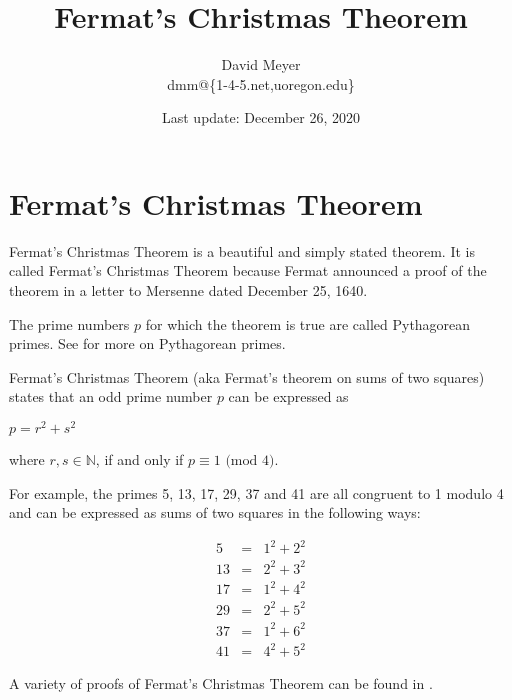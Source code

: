 \documentclass[11pt, oneside]{article}   	%
\title{Fermat's Christmas Theorem}
\author{David Meyer \\ dmm@\{1-4-5.net,uoregon.edu\}}
\date{Last update: December 26, 2020}
\theoremstyle{definition}
\begin{document}
\maketitle

\section*{Fermat's Christmas Theorem}

\noindent
Fermat's Christmas Theorem \cite{wiki:christmas_theorem} is a beautiful and simply stated theorem. It is called Fermat's Christmas Theorem because Fermat announced 
a proof of the theorem in a letter to Mersenne dated December 25, 1640. 

\bigskip
\noindent
The prime numbers $p$ for which the theorem is true are called Pythagorean primes. See \cite{wiki:pythagorean_primes} for more on Pythagorean primes.

\bigskip
\noindent
Fermat's Christmas Theorem (aka Fermat's theorem on sums of two squares) states that an odd prime number $p$ can be expressed as

\bigskip
\begin{center}
\scalebox{2.00} {$p = r^{2} + s^{2}$}
\end{center}
\bigskip

\noindent
where $r,s \in \mathbb{N}$, if and only if $p \equiv 1 \textrm{ (mod  $4$)}$.

\bigskip
\noindent
For example, the primes 5, 13, 17, 29, 37 and 41 are all congruent to 1 modulo 4 and can be expressed as sums of two squares in the following ways:

\begin{center}
\begin{equation*}
\begin{array}{rcll} 
5   &=& 1^{2} + 2^{2}   \\
13 &=& 2^{2} + 3^{2}   \\
17 &=&1^{2}  + 4^{2}    \\
29 &=& 2^{2} + 5^{2}    \\
37 &=& 1^{2} + 6^{2}    \\
41 &=& 4^{2} + 5^{2}
\end{array}
\end{equation*}
\end{center}

\bigskip
\noindent
A variety of proofs of Fermat's Christmas Theorem can be found in \cite{wiki:christmas_theorem_proofs}.




\end{document}
